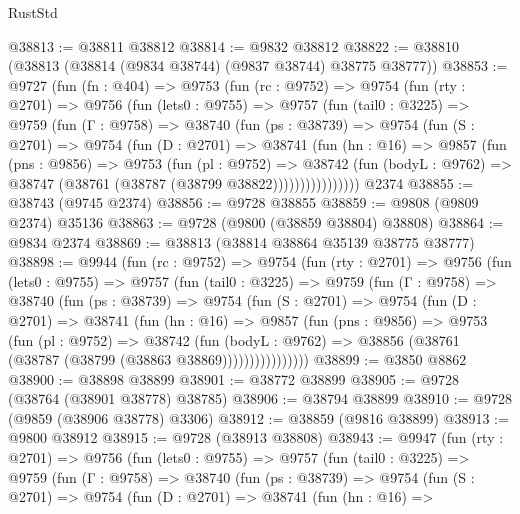 \begin{lexlean}{RustStd}
\begin{coremodule}
@38813 := @38811 @38812
@38814 := @9832 @38812
@38822 := @38810 (@38813 (@38814 (@9834 @38744) (@9837 @38744) @38775 @38777))
@38853 := @9727
    (fun (fn : @404) =>
    @9753
      (fun (rc : @9752) =>
      @9754
        (fun (rty : @2701) =>
        @9756
          (fun (lets0 : @9755) =>
          @9757
            (fun (tail0 : @3225) =>
            @9759
              (fun (Γ : @9758) =>
              @38740
                (fun (ps : @38739) =>
                @9754
                  (fun (S : @2701) =>
                  @9754
                    (fun (D : @2701) =>
                    @38741
                      (fun (hn : @16) =>
                      @9857
                        (fun (pns : @9856) =>
                        @9753
                          (fun (pl : @9752) =>
                          @38742
                            (fun (bodyL : @9762) =>
                            @38747 (@38761 (@38787 (@38799 @38822))))))))))))))))
    @2374
@38855 := @38743 (@9745 @2374)
@38856 := @9728 @38855
@38859 := @9808 (@9809 @2374) @35136
@38863 := @9728 (@9800 (@38859 @38804) @38808)
@38864 := @9834 @2374
@38869 := @38813 (@38814 @38864 @35139 @38775 @38777)
@38898 := @9944
    (fun (rc : @9752) =>
    @9754
      (fun (rty : @2701) =>
      @9756
        (fun (lets0 : @9755) =>
        @9757
          (fun (tail0 : @3225) =>
          @9759
            (fun (Γ : @9758) =>
            @38740
              (fun (ps : @38739) =>
              @9754
                (fun (S : @2701) =>
                @9754
                  (fun (D : @2701) =>
                  @38741
                    (fun (hn : @16) =>
                    @9857
                      (fun (pns : @9856) =>
                      @9753
                        (fun (pl : @9752) =>
                        @38742
                          (fun (bodyL : @9762) =>
                          @38856 (@38761 (@38787 (@38799 (@38863 @38869))))))))))))))))
@38899 := @3850 @8862
@38900 := @38898 @38899
@38901 := @38772 @38899
@38905 := @9728 (@38764 (@38901 @38778) @38785)
@38906 := @38794 @38899
@38910 := @9728 (@9859 (@38906 @38778) @3306)
@38912 := @38859 (@9816 @38899)
@38913 := @9800 @38912
@38915 := @9728 (@38913 @38808)
@38943 := @9947
    (fun (rty : @2701) =>
    @9756
      (fun (lets0 : @9755) =>
      @9757
        (fun (tail0 : @3225) =>
        @9759
          (fun (Γ : @9758) =>
          @38740
            (fun (ps : @38739) =>
            @9754
              (fun (S : @2701) =>
              @9754
                (fun (D : @2701) =>
                @38741
                  (fun (hn : @16) =>

\end{coremodule}
\end{lexlean}
